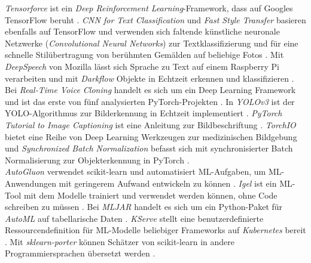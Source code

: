 \documentclass[german,bachelor]{swsLeipzig}
\begin{document}
\noindent \textit{Tensorforce} ist ein \textit{Deep Reinforcement Learning}-Framework, dass auf Googles TensorFlow beruht \cite[]{tensorforce}.
\textit{CNN for Text Classification} und \textit{Fast Style Transfer} basieren ebenfalls auf TensorFlow und verwenden
sich faltende künstliche neuronale Netzwerke (\textit{Convolutional Neural Networks}) zur Textklassifizierung \cite[]{CNN_for_Text_Classification} und für eine
schnelle Stilübertragung von berühmten Gemälden auf beliebige Fotos \cite[]{Fast_Style_Transfer}.
Mit \textit{DeepSpeech} von Mozilla lässt sich Sprache zu Text auf einem Raspberry Pi verarbeiten \cite[]{DeepSpeech} und mit
\textit{Darkflow} Objekte in Echtzeit erkennen und klassifizieren \cite[]{Darkflow}.\\
\indent Bei \textit{Real-Time Voice Cloning} handelt es sich um ein Deep Learning Framework und ist das erste von fünf
analysierten PyTorch-Projekten \cite[]{Charles2013}.
In \textit{YOLOv3} ist der YOLO-Algorithmus zur Bilderkennung in Echtzeit implementiert \cite[]{YOLO_v3}.
\textit{PyTorch Tutorial to Image Captioning} ist eine Anleitung zur Bildbeschriftung \cite[]{a_PyTorch_Tutorial_to_Image_Captioning}.
\textit{TorchIO} bietet eine Reihe von Deep Learning Werkzeugen zur medizinischen Bildgebung \cite[]{perez-garcia_torchio_2021}
und \textit{Synchronized Batch Normalization} befasst sich mit synchronisierter Batch Normalisierung zur
Objekterkennung in PyTorch \cite[]{Synchronized_Batchnorm}.\\
\indent \textit{AutoGluon} verwendet scikit-learn und automatisiert ML-Aufgaben, um ML-Anwendungen mit geringerem
Aufwand entwickeln zu können \cite[]{agtabular}.
\textit{Igel} ist ein ML-Tool mit dem Modelle trainiert und verwendet werden können, ohne Code schreiben zu müssen \cite[]{igel}.
Bei \textit{MLJAR} handelt es sich um ein Python-Paket für \textit{AutoML} auf tabellarische Daten \cite[]{mljar}.
\textit{KServe} stellt eine benutzerdefinierte Ressourcendefinition für ML-Modelle beliebiger Frameworks
auf \textit{Kubernetes} bereit \cite[]{KServe}.
Mit \textit{sklearn-porter} können Schätzer von scikit-learn in andere Programmiersprachen übersetzt werden \cite[]{sklearn_porter}.
\end{document}
